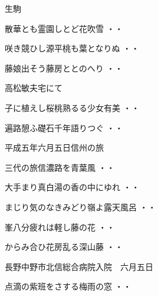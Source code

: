 生駒
\begin{shiika}散華とも霊園しとど花吹雪
\hfill{・・}\end{shiika}
\vspace{0.6cm}
\begin{shiika}咲き競ひし源平桃も葉となりぬ
\hfill{・・}\end{shiika}
\vspace{0.6cm}
\begin{shiika}藤娘出そう藤房ととのへり
\hfill{・・}\end{shiika}
\vspace{0.6cm}
高松敏夫宅にて
\begin{shiika}子に植えし桜桃熟るる少女有美
\hfill{・・}\end{shiika}
\vspace{0.6cm}
\begin{shiika}遍路憩ふ礎石千年語りつぐ
\hfill{・・}\end{shiika}
\vspace{0.6cm}
平成五年六月五日信州の旅
\begin{shiika}三代の旅信濃路を青葉風
\hfill{・・}\end{shiika}
\vspace{0.6cm}
\begin{shiika}大手まり真白湯の香の中にゆれ
\hfill{・・}\end{shiika}
\vspace{0.6cm}
\begin{shiika}まじり気のなきみどり嶺よ露天風呂
\hfill{・・}\end{shiika}
\vspace{0.6cm}
\begin{shiika}峯八分疲れは軽し藤の花
\hfill{・・}\end{shiika}
\vspace{0.6cm}
\begin{shiika}からみ合ひ花房乱る深山藤
\hfill{・・}\end{shiika}
\vspace{0.6cm}
長野中野市北信総合病院入院　六月五日
\begin{shiika}点滴の紫班をさする梅雨の窓
\hfill{・・}\end{shiika}
